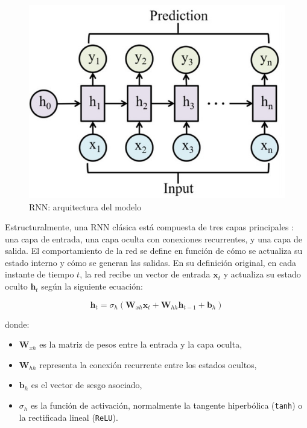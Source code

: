  \begin{figure}[H] %
 	\centering
 	\includegraphics[scale=0.4]{img/rnn}
 	\caption{RNN: arquitectura del modelo \cite{info15090517}}
 	\label{rnn}
 \end{figure}  	
 
Estructuralmente, una RNN clásica está compuesta de tres capas principales \cite{info15090517}: una capa de entrada, una capa oculta con conexiones recurrentes, y una capa de salida. El comportamiento de la red se define en función de cómo se actualiza su estado interno y cómo se generan las salidas. En su definición original, en cada instante de tiempo \( t \), la red recibe un vector de entrada \( \mathbf{x}_t \) y actualiza su estado oculto \( \mathbf{h}_t \) según la siguiente ecuación:

\begin{equation}
	\mathbf{h}_t = \sigma_h(\mathbf{W}_{xh} \mathbf{x}_t + \mathbf{W}_{hh} \mathbf{h}_{t-1} + \mathbf{b}_h)
\end{equation}

donde:
\begin{itemize}
	\item \( \mathbf{W}_{xh} \) es la matriz de pesos entre la entrada y la capa oculta,
	\item \( \mathbf{W}_{hh} \) representa la conexión recurrente entre los estados ocultos,
	\item \( \mathbf{b}_h \) es el vector de sesgo asociado,
	\item \textbf{\( \sigma_h \)} es la función de activación, normalmente la tangente hiperbólica (\texttt{tanh}) o la rectificada lineal (\texttt{ReLU}).
\end{itemize}

